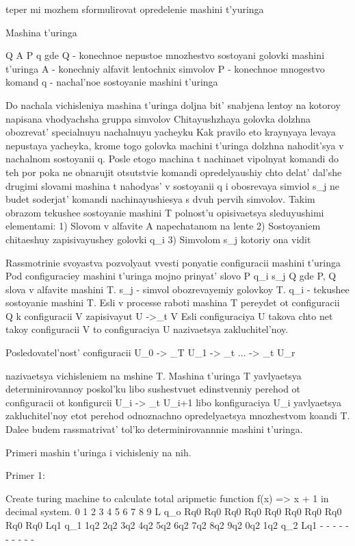 teper mi mozhem sformulirovat opredelenie mashini t'yuringa

Mashina t'uringa 

Q A P q gde Q - konechnoe nepustoe mnozhestvo sostoyani golovki mashini t'uringa 
A - konechniy alfavit lentochnix simvolov
P - konechnoe mnogestvo komand
q - nachal'noe sostoyanie mashini t'uringa

Do nachala vichisleniya mashina t'uringa doljna bit' snabjena lentoy na kotoroy napisana vhodyachsha gruppa simvolov
Chitayushzhaya golovka dolzhna obozrevat' specialnuyu nachalnuyu yacheyku 
Kak pravilo eto kraynyaya levaya nepustaya yacheyka, krome togo golovka machini t'uringa dolzhna nahodit'sya v nachalnom sostoyanii q.
Posle etogo machina t nachinaet vipolnyat komandi do teh por poka ne obnarujit otsutstvie komandi opredelyaushiy chto delat' dal'she drugimi slovami mashina t nahodyas' v sostoyanii q i obosrevaya simviol s_j ne budet soderjat' komandi nachinayushiesya s dvuh pervih simvolov. Takim obrazom tekushee sostoyanie mashini T polnost'u opisivaetsya sleduyushimi elementami:
1) Slovom v alfavite A napechatanom na lente
2) Sostoyaniem chitaeshuy zapisivayushey golovki q_i
3) Simvolom s_j kotoriy ona vidit

Rassmotrinie svoyastva pozvolyaut vvesti ponyatie configuracii mashini t'uringa
Pod configuraciey mashini t'uringa mojno prinyat' slovo P q_i s_j Q gde P, Q slova v alfavite mashini T.
s_j - simvol obozrevayemiy golovkoy T. q_i - tekushee sostoyanie mashini T. Esli v processe raboti mashina T pereydet ot configuracii Q k configuracii V zapisivayut U ->_t V
Esli configuraciya U takova chto net takoy configuracii V to configuraciya U nazivaetsya zakluchitel'noy.

Posledovatel'nost' configuracii U_0 -> _T U_1  -> _t ... -> _t U_r

nazivaetsya vichisleniem na mshine T.
Mashina t'uringa T yavlyaetsya determinirovannoy poskol'ku libo sushestvuet edinstvenniy perehod ot configuracii ot konfigurcii U_i -> _t U_i+1 libo konfiguraciya U_i yavlyaetsya zakluchitel'noy etot perehod odnoznachno opredelyaetsya mnozhestvom koandi T. Dalee budem rassmatrivat' tol'ko determinirovannnie mashini t'uringa.

Primeri mashin t'uringa i vichisleniy na nih.

Primer 1:

Create turing machine to calculate total aripmetic function f(x) => x + 1 in decimal system.
    0    1    2   3   4   5   6   7   8   9    L
q_o Rq0  Rq0  Rq0 Rq0 Rq0 Rq0 Rq0 Rq0 Rq0 Rq0  Lq1
q_1 1q2  2q2  3q2 4q2 5q2 6q2 7q2 8q2 9q2 0q2  1q2
q_2 Lq1  -    -   -   -   -   -   -   -   -    -  

